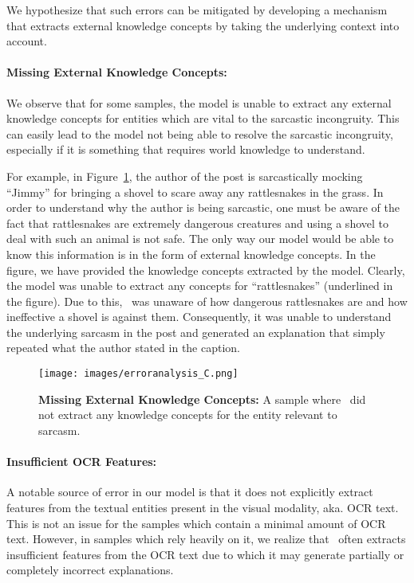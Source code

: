 We hypothesize that such errors can be mitigated by developing a mechanism that extracts external knowledge concepts by taking the underlying context into account.

\paragraph{Missing External Knowledge Concepts:} We observe that for some samples, the model is unable to extract any external knowledge concepts for entities which are vital to the sarcastic incongruity. This can easily lead to the model not being able to resolve the sarcastic incongruity, especially if it is something that requires world knowledge to understand. 

For example, in Figure~\ref{fig:error-analysis-no-knowledge}, the author of the post is sarcastically mocking ``Jimmy'' for bringing a shovel to scare away any rattlesnakes in the grass. In order to understand why the author is being sarcastic, one must be aware of the fact that rattlesnakes are extremely dangerous creatures and using a shovel to deal with such an animal is not safe. The only way our model would be able to know this information is in the form of external knowledge concepts. In the figure, we have provided the knowledge concepts extracted by the model. Clearly, the model was unable to extract any concepts for ``rattlesnakes'' (underlined in the figure). Due to this, \model\ was unaware of how dangerous rattlesnakes are and how ineffective a shovel is against them. Consequently, it was unable to understand the underlying sarcasm in the post and generated an explanation that simply repeated what the author stated in the caption.
\begin{figure}[!h]
\centering
  \texttt{[image: images/erroranalysis\_C.png]}
  \caption{\textbf{Missing External Knowledge Concepts:} A sample where \model\ did not extract any knowledge concepts for the entity relevant to sarcasm. %
}
\label{fig:error-analysis-no-knowledge}
\end{figure}

\paragraph{Insufficient OCR Features:} A notable source of error in our model is that it does not explicitly extract features from the textual entities present in the visual modality, aka. OCR text. This is not an issue for the samples which contain a minimal amount of OCR text. However, in samples which rely heavily on it, we realize that \model\ often extracts insufficient features from the OCR text due to which it may generate partially or completely incorrect explanations.


